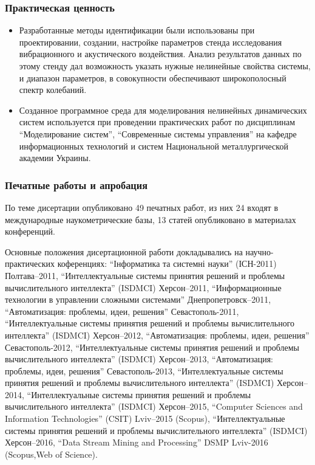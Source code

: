 \documentclass[10pt,utf8]{beamer}
\begin{document}

\begin{frame}
  \frametitle{Практическая ценность}

  \begin{itemize}

    \item
      Разработанные методы идентификации были использованы при проектировании,
      создании, настройке параметров стенда исследования вибрационного и
      акустического воздействия. Анализ результатов данных по этому стенду дал
      возможность указать нужные нелинейные свойства системы, и диапазон параметров,
      в совокупности обеспечивают широкополосный спектр колебаний.

    \item
      Созданное программное среда для моделирования нелинейных динамических систем
      используется при проведении практических работ по дисциплинам
      ``Моделирование систем'', ``Современные системы управления''
      на кафедре информационных технологий
      и систем Национальной металлургической академии Украины.

  \end{itemize}


\end{frame}




\begin{frame}
  \frametitle{Печатные работы и апробация}

По теме дисертации опубликовано
49 печатных работ,
из них
24 входят в международные наукометрические базы,
13 статей опубликовано в материалах конференций.

{\scriptsize
Основные положения дисертационной работи докладывались на
научно-практических коференциях:
``Інформатика та системні науки'' (ІСН-2011) Полтава--2011,
``Интеллектуальные системы принятия решений и проблемы вычислительного интеллекта'' (ISDMCI) Херсон--2011,
``Информационные технологии в управлении сложными системами'' Днепропетровск--2011,
``Автоматизация: проблемы, идеи, решения'' Севастополь-2011,
``Интеллектуальные системы принятия решений и проблемы вычислительного интеллекта'' (ISDMCI) Херсон--2012,
``Автоматизация: проблемы, идеи, решения'' Севастополь-2012,
``Интеллектуальные системы принятия решений и проблемы вычислительного интеллекта'' (ISDMCI) Херсон--2013,
``Автоматизация: проблемы, идеи, решения'' Севастополь-2013,
``Интеллектуальные системы принятия решений и проблемы вычислительного интеллекта'' (ISDMCI) Херсон--2014,
``Интеллектуальные системы принятия решений и проблемы вычислительного интеллекта'' (ISDMCI) Херсон--2015,
``Computer Sciences and Information Technologies'' (CSIT) Lviv--2015 (Scopus),
``Интеллектуальные системы принятия решений и проблемы вычислительного интеллекта'' (ISDMCI) Херсон--2016,
``Data Stream Mining and Processing'' DSMP Lviv-2016 (Scopus,Web of Science).
}

\end{frame}
\end{document}

